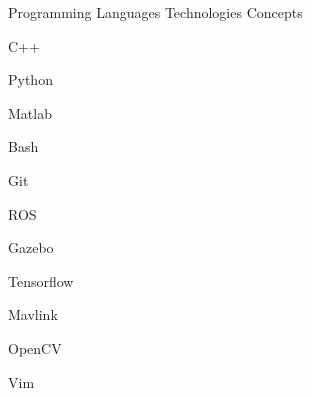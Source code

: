 
\begin{cventries}

  \cventrycol
  {Programming Languages}
  {Technologies}
  {Concepts}
  {
    \begin{cvitems}
      \item {C++}
      \item {Python}
      \item {Matlab}
      \item {Bash}
    \end{cvitems}
  }
  {
    \begin{cvitems}
      \item {Git}
      \item {ROS}
      \item {Gazebo}
      \item {Tensorflow}
      \item {Mavlink}
      \item {OpenCV}
      \item {Vim}
    \end{cvitems}
  }
  {
    \begin{cvitems}
    \end{cvitems}
  }

\end{cventries}
